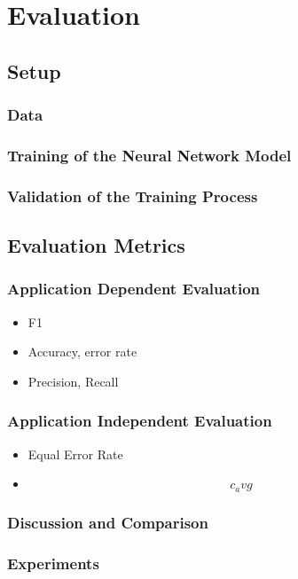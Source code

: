 \section{Evaluation}

\subsection{Setup}
\subsubsection{Data}
\subsubsection{Training of the Neural Network Model}
\subsubsection{Validation of the Training Process}

\subsection{Evaluation Metrics}
\subsubsection{Application Dependent Evaluation}
\begin{itemize}
    \item F1
    \item Accuracy, error rate
    \item Precision, Recall
\end{itemize}
\subsubsection{Application Independent Evaluation}
\begin{itemize}
    \item Equal Error Rate
    \item $$c_avg$$
\end{itemize}


\subsubsection{Discussion and Comparison}
\subsubsection{Experiments}
